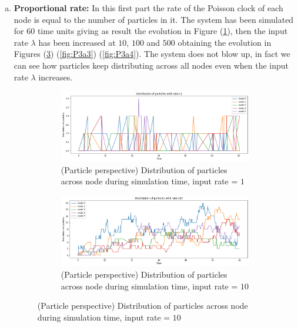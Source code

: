 \documentclass[
	12pt, %
]{fphw}
\begin{document}
\begin{enumerate}[a)\normalfont]
    \item \textbf{Proportional rate:}\newline
    In this first part the rate of the Poisson clock of each node is equal to the number of particles in it.
    The system has been simulated for 60 time units giving as result the evolution in Figure (\ref{fig:P3a1}), then the input rate $\lambda$ has been increased at $10$, $100$ and $500$ obtaining the evolution in Figures (\ref{fig:P3a2}) (\ref{fig:P3a3}) (\ref{fig:P3a4}). 
    The system does not blow up, in fact we can see how particles  keep distributing across all nodes even when the input rate $\lambda$ increases. 
    
    \begin{figure}
    \centering
        \begin{subfigure}{0.7\textwidth}
            \centering
            \includegraphics[width=1\linewidth]{P3a1.png}
            \caption{(Particle perspective) Distribution of particles across node during simulation time, input rate = $1$}
            \label{fig:P3a1}
        \end{subfigure}
        \begin{subfigure}{0.7\textwidth}
            \centering
            \includegraphics[width=1\linewidth]{P3a2.png}
            \caption{(Particle perspective) Distribution of particles across node during simulation time, input rate = $10$}
            \label{fig:P3a2}
        \end{subfigure}

\end{figure}
\end{enumerate}
\end{document}

